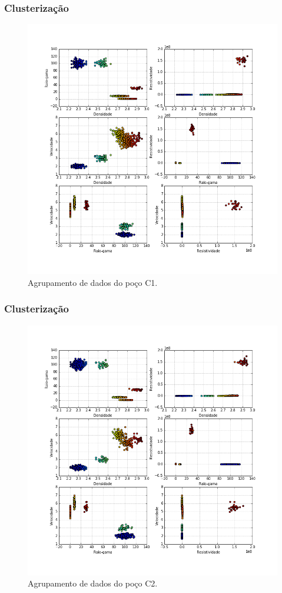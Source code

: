 \documentclass[10pt]{beamer} %
\begin{document}
\begin{frame}
	\frametitle{Clusterização}
	\begin{figure}[H]
		\centering
			\includegraphics[scale=0.3]{Imagens/cluterpocoC1.png}
		\caption{Agrupamento de dados do poço C1.}
		\label{clusterC1}
	\end{figure} 
\end{frame}

\begin{frame}
	\frametitle{Clusterização}
	\begin{figure}[H]
		\centering
			\includegraphics[scale=0.3]{Imagens/cluterpocoC2.png}
		\caption{Agrupamento de dados do poço C2.}
		\label{clusterC2}
	\end{figure} 
\end{frame}
\end{document}
